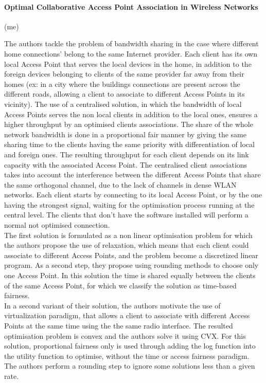 \documentclass[journal,transmag]{IEEEtran}
\begin{document}
\paragraph{Optimal Collaborative Access Point Association in Wireless Networks \cite{14optimalAP_INFOCOM}} (me)

The authors tackle the problem of bandwidth sharing in the case where different home connections' belong to the same Internet provider. Each client has its own local Access Point that serves the local devices in the home, in addition to the foreign devices belonging to clients of the same provider far away from their homes (ex: in a city where the buildings connections are present across the different roads, allowing a client to associate to different Access Points in its vicinity). The use of a centralised solution, in which the bandwidth of local Access Points serves the non local clients in addition to the local ones, ensures a higher throughput by an optimised clients associations. The share of the whole network bandwidth is done in a proportional fair manner by giving the same sharing time to the clients having the same priority with differentiation of local and foreign ones. The resulting throughput for each client depends on its link capacity with the associated Access Point. The centralised client associations takes into account the interference between the different Access Points that share the same orthogonal channel, due to the lack of channels in dense WLAN networks. Each client starts by connecting to its local Access Point, or by the one having the strongest signal, waiting for the optimisation process running at the central level. The clients that don't have the software installed will perform a normal not optimised connection.\\ 
The first solution is formulated as a non linear optimisation problem for which the authors propose the use of relaxation, which means that each client could associate to different Access Points, and the problem become a discretized linear program. As a second step, they propose using rounding methods to choose only one Access Point. In this solution the time is shared equally between the clients of the same Access Point, for which we classify the solution as time-based fairness. \\ 
In a second variant of their solution, the authors motivate the use of virtualization paradigm, that allows a client to associate with different Access Points at the same time using the the same radio interface. The resulted optimisation problem is convex and the authors solve it using CVX. For this solution, proportional fairness only is used through adding the log function into the utility function to optimise, without the time or access fairness paradigm. The authors perform a rounding step to ignore some solutions less than a given rate. \\
\end{document}

